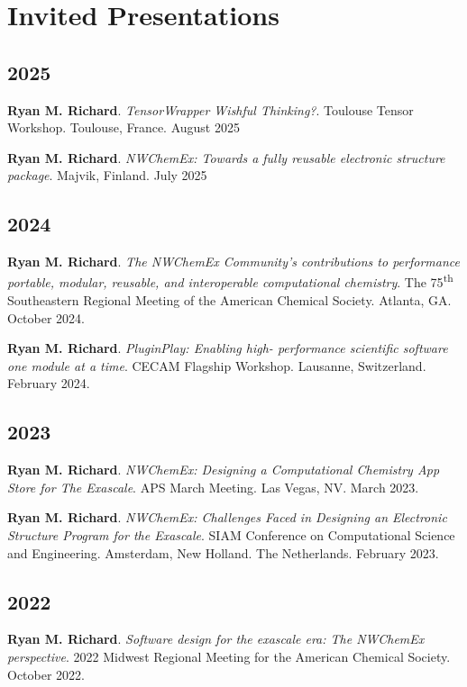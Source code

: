 \section{Invited Presentations}
\vspace{5pt}
\begin{etaremune}
	\item[]{}
   	\subsection{2025}
	\item {\textbf{Ryan M. Richard}. \textit{TensorWrapper Wishful Thinking?}. Toulouse Tensor Workshop. Toulouse, France.  August 2025}
	\item{\textbf{Ryan M. Richard}. \textit{NWChemEx: Towards a fully reusable electronic structure package}. Majvik, Finland. July 2025}
	\subsection{2024}
	\item{\textbf{Ryan M. Richard}. \textit{The NWChemEx Community's contributions to performance portable, modular, reusable, and interoperable computational chemistry}. The 75\textsuperscript{th} Southeastern Regional Meeting of the American Chemical Society. Atlanta, GA. October 2024.}
	\item{\textbf{Ryan M. Richard}. \textit{PluginPlay: Enabling high-
	      performance scientific software one module at a time}. CECAM Flagship
		  Workshop. Lausanne, Switzerland. February 2024.}

	\subsection{2023}
	\item{\textbf{Ryan M. Richard}. \textit{NWChemEx: Designing a Computational
	      Chemistry App Store for The Exascale}. APS March Meeting. Las Vegas,
		  NV. March 2023.}
	\item{\textbf{Ryan M. Richard}. \textit{NWChemEx: Challenges Faced in
	      Designing an Electronic Structure Program for the Exascale}. SIAM
		  Conference on Computational Science and Engineering. Amsterdam, New
		  Holland. The Netherlands. February 2023.}

	\subsection{2022}
    \item{\textbf{Ryan M. Richard}. \textit{Software design for the exascale
	      era: The NWChemEx perspective}. 2022 Midwest Regional Meeting for the
		  American Chemical Society. October 2022.}


\end{etaremune}
